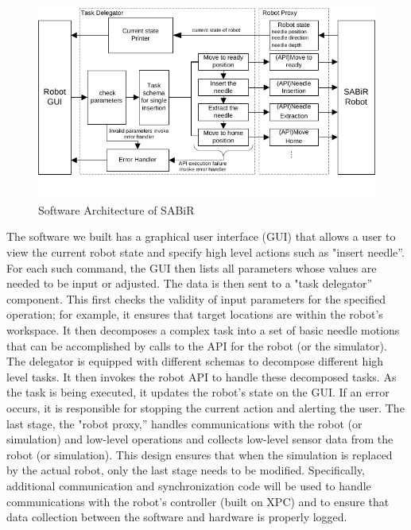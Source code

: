 \begin{figure}[!thpb]
\centering
\includegraphics[width=\textwidth]{chapter5_SABiRsw.pdf}
\caption{Software Architecture of SABiR}
\label{sabirsw}
\end{figure}

The software we built has a graphical user interface (GUI) that allows a user to view the current robot state and specify high level actions such as "insert needle''. For each such command, the GUI then lists all parameters whose values are needed to be input or adjusted. The data is then sent to a "task delegator'' component. This first checks the validity of input parameters for the specified operation; for example, it ensures that target locations are within the robot’s workspace. It then decomposes a complex task into a set of basic needle motions that can be accomplished by calls to the API for the robot (or the simulator). The delegator is equipped with different schemas to decompose different high level tasks. It then invokes the robot API to handle these decomposed tasks. As the task is being executed, it updates the robot’s state on the GUI. If an error occurs, it is responsible for stopping the current action and alerting the user. The last stage, the "robot proxy,'' handles communications with the robot (or simulation) and low-level operations and collects low-level sensor data from the robot (or simulation). This design ensures that when the simulation is replaced by the actual robot, only the last stage needs to be modified. Specifically, additional communication and synchronization code will be used to handle communications with the robot’s controller (built on XPC) and to ensure that data collection between the software and hardware is properly logged.

